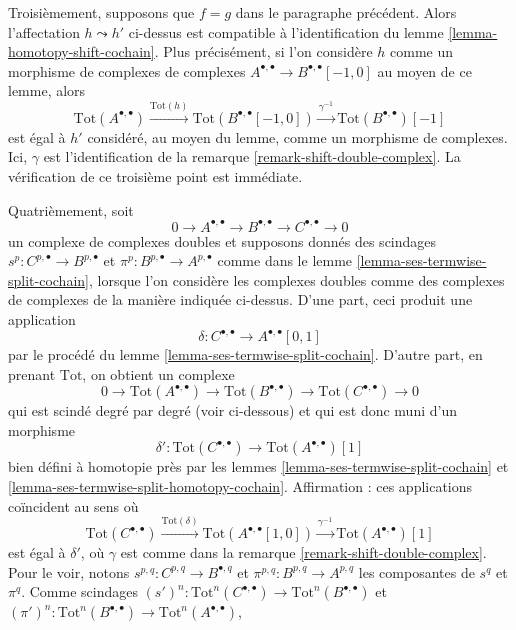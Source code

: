 \begin{remark}
\medskip\noindent
Troisièmement, supposons que $f = g$ dans le paragraphe précédent.
Alors l'affectation $h \leadsto h'$ ci-dessus est compatible à
l'identification du lemme \ref{lemma-homotopy-shift-cochain}.
Plus précisément, si l'on considère $h$ comme un morphisme de complexes
de complexes $A^{\bullet, \bullet} \to B^{\bullet, \bullet}[-1, 0]$
au moyen de ce lemme, alors
$$
\text{Tot}(A^{\bullet, \bullet})
\xrightarrow{\text{Tot}(h)}
\text{Tot}(B^{\bullet, \bullet}[-1, 0])
\xrightarrow{\gamma^{-1}}
\text{Tot}(B^{\bullet, \bullet})[-1]
$$
est égal à $h'$ considéré, au moyen du lemme, comme un morphisme de complexes.
Ici, $\gamma$ est l'identification de la
remarque \ref{remark-shift-double-complex}.
La vérification de ce troisième point est immédiate.

\medskip\noindent
Quatrièmement, soit
$$
0 \to A^{\bullet, \bullet} \to B^{\bullet, \bullet} \to
C^{\bullet, \bullet} \to 0
$$
un complexe de complexes doubles et supposons donnés des scindages
$s^p : C^{p, \bullet} \to B^{p, \bullet}$ et
$\pi^p : B^{p, \bullet} \to A^{p, \bullet}$
comme dans le lemme \ref{lemma-ses-termwise-split-cochain},
lorsque l'on considère les complexes doubles
comme des complexes de complexes de la manière indiquée ci-dessus.
D'une part, ceci produit une application
$$
\delta : C^{\bullet, \bullet} \longrightarrow A^{\bullet, \bullet}[0, 1]
$$
par le procédé du lemme \ref{lemma-ses-termwise-split-cochain}.
D'autre part, en prenant $\text{Tot}$, on obtient un complexe
$$
0 \to \text{Tot}(A^{\bullet, \bullet}) \to
\text{Tot}(B^{\bullet, \bullet}) \to
\text{Tot}(C^{\bullet, \bullet}) \to 0
$$
qui est scindé degré par degré (voir ci-dessous) et qui est donc muni d'un morphisme
$$
\delta' :
\text{Tot}(C^{\bullet, \bullet})
\longrightarrow
\text{Tot}(A^{\bullet, \bullet})[1]
$$
bien défini à homotopie près par les lemmes \ref{lemma-ses-termwise-split-cochain}
et \ref{lemma-ses-termwise-split-homotopy-cochain}. Affirmation :
ces applications coïncident au sens où
$$
\text{Tot}(C^{\bullet, \bullet})
\xrightarrow{\text{Tot}(\delta)}
\text{Tot}(A^{\bullet, \bullet}[1, 0]) \xrightarrow{\gamma^{-1}}
\text{Tot}(A^{\bullet, \bullet})[1]
$$
est égal à $\delta'$, où $\gamma$ est comme dans la
remarque \ref{remark-shift-double-complex}. Pour le voir, notons
$s^{p, q} : C^{p, q} \to B^{\bullet, q}$ et
$\pi^{p, q} : B^{p, q} \to A^{p, q}$ les composantes de $s^q$ et $\pi^q$.
Comme scindages
$(s')^n : \text{Tot}^n(C^{\bullet, \bullet}) \to
\text{Tot}^n(B^{\bullet, \bullet})$
et
$(\pi')^n : \text{Tot}^n(B^{\bullet, \bullet}) \to
\text{Tot}^n(A^{\bullet, \bullet})$,

\end{remark}
